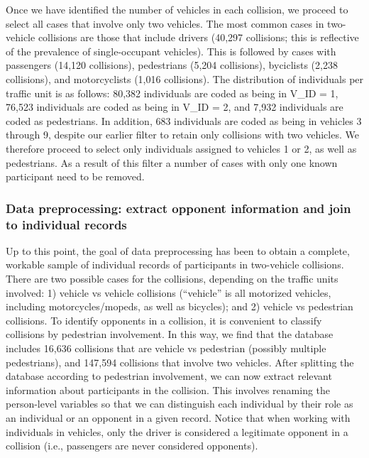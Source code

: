 \documentclass[]{elsarticle} %
\begin{document}
Once we have identified the number of vehicles in each collision, we
proceed to select all cases that involve only two vehicles. The most
common cases in two-vehicle collisions are those that include drivers
(40,297 collisions; this is reflective of the prevalence of
single-occupant vehicles). This is followed by cases with passengers
(14,120 collisions), pedestrians (5,204 collisions), byciclists (2,238
collisions), and motorcyclists (1,016 collisions). The distribution of
individuals per traffic unit is as follows: 80,382 individuals are coded
as being in V\_ID = 1, 76,523 individuals are coded as being in V\_ID =
2, and 7,932 individuals are coded as pedestrians. In addition, 683
individuals are coded as being in vehicles 3 through 9, despite our
earlier filter to retain only collisions with two vehicles. We therefore
proceed to select only individuals assigned to vehicles 1 or 2, as well
as pedestrians. As a result of this filter a number of cases with only
one known participant need to be removed.

\hypertarget{data-preprocessing-extract-opponent-information-and-join-to-individual-records}{%
\subsubsection{Data preprocessing: extract opponent information and join
to individual
records}\label{data-preprocessing-extract-opponent-information-and-join-to-individual-records}}

Up to this point, the goal of data preprocessing has been to obtain a
complete, workable sample of individual records of participants in
two-vehicle collisions. There are two possible cases for the collisions,
depending on the traffic units involved: 1) vehicle vs vehicle
collisions (``vehicle'' is all motorized vehicles, including
motorcycles/mopeds, as well as bicycles); and 2) vehicle vs pedestrian
collisions. To identify opponents in a collision, it is convenient to
classify collisions by pedestrian involvement. In this way, we find that
the database includes 16,636 collisions that are vehicle vs pedestrian
(possibly multiple pedestrians), and 147,594 collisions that involve two
vehicles. After splitting the database according to pedestrian
involvement, we can now extract relevant information about participants
in the collision. This involves renaming the person-level variables so
that we can distinguish each individual by their role as an individual
or an opponent in a given record. Notice that when working with
individuals in vehicles, only the driver is considered a legitimate
opponent in a collision (i.e., passengers are never considered
opponents).
\end{document}
